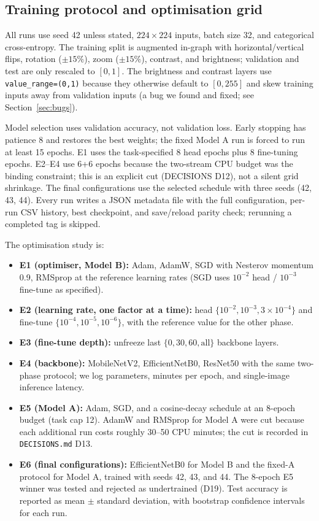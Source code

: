\documentclass[11pt,a4paper]{article}
\begin{document}
\subsection{Training protocol and optimisation grid}
All runs use seed 42 unless stated, $224\times224$ inputs, batch size 32, and
categorical cross-entropy. The training split is augmented in-graph with
horizontal/vertical flips, rotation ($\pm15\%$), zoom ($\pm15\%$), contrast, and
brightness; validation and test are only rescaled to $[0,1]$. The brightness
and contrast layers use \texttt{value\_range=(0,1)} because they otherwise
default to $[0,255]$ and skew training inputs away from validation inputs (a
bug we found and fixed; see Section~\ref{sec:bugs}).

Model selection uses validation accuracy, not validation loss. Early stopping
has patience 8 and restores the best weights; the fixed Model A run is forced
to run at least 15 epochs. E1 uses the task-specified 8 head epochs plus 8
fine-tuning epochs. E2--E4 use 6+6 epochs because the two-stream CPU budget
was the binding constraint; this is an explicit cut (DECISIONS D12), not a
silent grid shrinkage. The final configurations use the selected schedule with
three seeds (42, 43, 44). Every run writes a JSON metadata file
with the full configuration, per-run CSV history, best checkpoint, and
save/reload parity check; rerunning a completed tag is skipped.

The optimisation study is:
\begin{itemize}
  \item \textbf{E1 (optimiser, Model B):} Adam, AdamW, SGD with Nesterov
        momentum 0.9, RMSprop at the reference learning rates (SGD uses
        $10^{-2}$ head / $10^{-3}$ fine-tune as specified).
  \item \textbf{E2 (learning rate, one factor at a time):} head
        $\{10^{-2},10^{-3},3\times10^{-4}\}$ and fine-tune
        $\{10^{-4},10^{-5},10^{-6}\}$, with the reference value for the other
        phase.
  \item \textbf{E3 (fine-tune depth):} unfreeze last $\{0,30,60,\text{all}\}$
        backbone layers.
  \item \textbf{E4 (backbone):} MobileNetV2, EfficientNetB0, ResNet50 with the
        same two-phase protocol; we log parameters, minutes per epoch, and
        single-image inference latency.
  \item \textbf{E5 (Model A):} Adam, SGD, and a cosine-decay schedule at an
        8-epoch budget (task cap 12). AdamW and RMSprop for Model A were cut
        because each additional run costs roughly 30--50 CPU minutes; the cut
        is recorded in \texttt{DECISIONS.md} D13.
  \item \textbf{E6 (final configurations):} EfficientNetB0 for Model B and the
        fixed-A protocol for Model A, trained with seeds 42, 43, and 44. The
        8-epoch E5 winner was tested and rejected as undertrained (D19). Test
        accuracy is reported as mean $\pm$ standard deviation, with bootstrap
        confidence intervals for each run.
\end{itemize}
\end{document}
